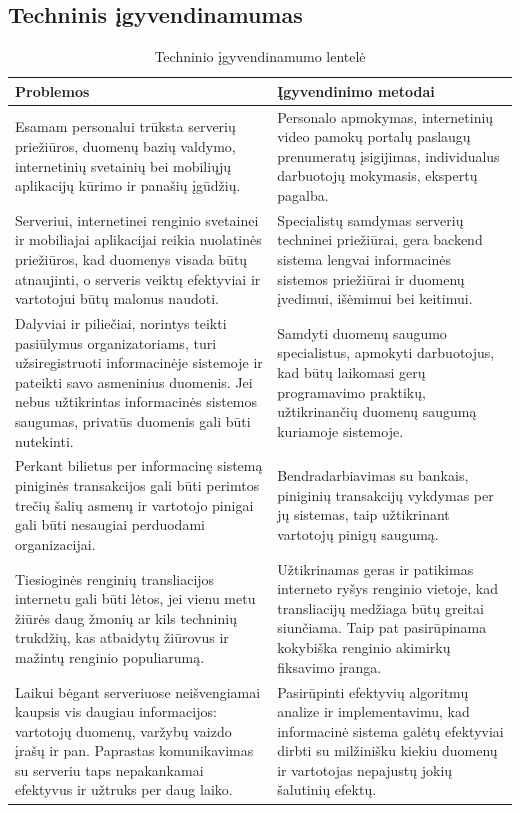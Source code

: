 \documentclass{VUMIFPSkursinis}
\begin{document}
  \subsection{Techninis įgyvendinamumas} \label{igyvendinamumoIrNaudosAnalize_techninis}
	\begin{table}[H]
      \caption{Techninio įgyvendinamumo lentelė}
      \label{table:techninisIgyvendinamumas}
      \begin{tabularx} {.9\textwidth}{ | X | X |}
        \hline
			\textbf{Problemos} & \textbf{Įgyvendinimo metodai} \\
		\hline
			Esamam personalui trūksta serverių priežiūros, duomenų bazių valdymo, internetinių svetainių bei mobiliųjų aplikacijų kūrimo ir panašių įgūdžių. & Personalo apmokymas, internetinių video pamokų portalų paslaugų prenumeratų įsigijimas, individualus darbuotojų mokymasis, ekspertų pagalba. \\
		\hline
			Serveriui, internetinei renginio svetainei ir mobiliajai aplikacijai reikia nuolatinės priežiūros, kad duomenys visada būtų atnaujinti, o serveris veiktų efektyviai ir vartotojui būtų malonus naudoti. & Specialistų samdymas serverių techninei priežiūrai, gera backend sistema lengvai informacinės sistemos priežiūrai ir duomenų įvedimui, išėmimui bei keitimui. \\
		\hline
			Dalyviai ir piliečiai, norintys teikti pasiūlymus organizatoriams, turi užsiregistruoti informacinėje sistemoje ir pateikti savo asmeninius duomenis. Jei nebus užtikrintas informacinės sistemos saugumas, privatūs duomenis gali būti nutekinti. & Samdyti duomenų saugumo specialistus, apmokyti darbuotojus, kad būtų laikomasi gerų programavimo praktikų, užtikrinančių duomenų saugumą kuriamoje sistemoje. \\
		\hline
			Perkant bilietus per informacinę sistemą piniginės transakcijos gali būti perimtos trečių šalių asmenų ir vartotojo pinigai gali būti nesaugiai perduodami organizacijai. & Bendradarbiavimas su bankais, piniginių transakcijų vykdymas per jų sistemas, taip užtikrinant vartotojų pinigų saugumą. \\
		\hline
			Tiesioginės renginių transliacijos internetu gali būti lėtos, jei vienu metu žiūrės daug žmonių ar kils techninių trukdžių, kas atbaidytų žiūrovus ir mažintų renginio populiarumą. & Užtikrinamas geras ir patikimas interneto ryšys renginio vietoje, kad transliacijų medžiaga būtų greitai siunčiama. Taip pat pasirūpinama kokybiška renginio akimirkų fiksavimo įranga. \\
		\hline
			Laikui bėgant serveriuose neišvengiamai kaupsis vis daugiau informacijos: vartotojų duomenų, varžybų vaizdo įrašų ir pan. Paprastas komunikavimas su serveriu taps nepakankamai efektyvus ir užtruks per daug laiko. & Pasirūpinti efektyvių algoritmų analize ir implementavimu, kad informacinė sistema galėtų efektyviai dirbti su milžinišku kiekiu duomenų ir vartotojas nepajustų jokių šalutinių efektų. \\
		\hline
      \end{tabularx}
    \end{table}
\end{document}
